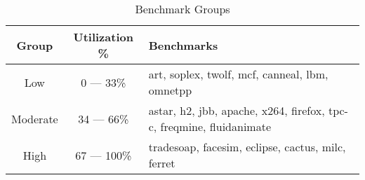 \begin{table}[t]
\vspace{-10pt}
\begin{center}
\caption{Benchmark Groups}
\label{table:benchmark_categories}
{
  \begin{tabular}{ |@{~}c@{~}|@{~}c@{~}|@{~}p{}@{~}|}
    \hline
    Group & Utilization \% & Benchmarks \\
    \hline
    Low        & 0 --- 33\% & art, soplex, twolf, mcf, canneal, lbm, omnetpp \\
    \hline
    Moderate   & 34 --- 66\% & astar, h2, jbb, apache, x264, firefox, tpc-c, freqmine, fluidanimate \\
    \hline
    High       & 67 --- 100\% & tradesoap, facesim, eclipse, cactus, milc, ferret \\
    \hline
  \end{tabular}
 }
\end{center}
\end{table}
